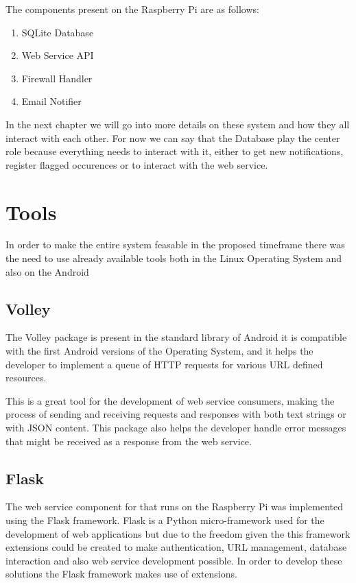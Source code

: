 The components present on the Raspberry Pi are as follows:
\begin{enumerate}
	\item SQLite Database
	\item Web Service API
	\item Firewall Handler
	\item Email Notifier
\end{enumerate}

In the next chapter we will go into more details on these system and how they
all interact with each other. For now we can say that the Database play the
center role because everything needs to interact with it, either to get new
notifications, register flagged occurences or to interact with the web service.

\section{Tools}
\label{chap3:sec:tools}
In order to make the entire system feasable in the proposed timeframe there was
the need to use already available tools both in the Linux Operating System and
also on the Android

\subsection{Volley}
\label{chap3:sec:tools:sub:volley}
The Volley package is present in the standard library of Android it is
compatible with the first Android versions of the Operating System, and it helps
the developer to implement a queue of HTTP requests for various URL defined
resources.

This is a great tool for the development of web service consumers, making the
process of sending and receiving requests and responses with both text strings
or with JSON content. This package also helps the developer handle error
messages that might be received as a response from the web service.

\subsection{Flask}
\label{chap3:sec:tools:sub:flask}
The web service component for that runs on the Raspberry Pi was implemented
using the Flask framework. Flask is a Python micro-framework used for the development
of web applications but due to the freedom given the this framework extensions
could be created to make authentication, URL management, database interaction
and also web service development possible. In order to develop these solutions
the Flask framework makes use of extensions.


